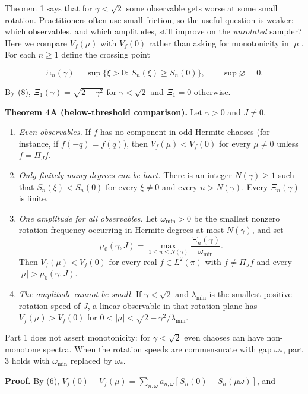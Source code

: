 \documentclass[
  british,
  11pt,
  a4paper,
]{article}
\providecommand{\tightlist}{%
  \setlength{\itemsep}{0pt}\setlength{\parskip}{0pt}}
\begin{document}
Theorem 1 says that for \(\gamma<\sqrt2\) some observable gets worse at
some small rotation. Practitioners often use small friction, so the
useful question is weaker: which observables, and which amplitudes,
still improve on the \emph{unrotated} sampler? Here we compare
\(V_f(\mu)\) with \(V_f(0)\) rather than asking for monotonicity in
\(|\mu|\). For each \(n\ge1\) define the crossing point

\[
\Xi_n(\gamma)=\sup\{\xi>0:\ S_n(\xi)\ge S_n(0)\},\qquad\sup\varnothing=0 .
\]

By (8), \(\Xi_1(\gamma)=\sqrt{2-\gamma^2}\) for \(\gamma<\sqrt2\) and
\(\Xi_1=0\) otherwise.

\textbf{Theorem 4A (below-threshold comparison).} Let \(\gamma>0\) and
\(J\ne0\).

\begin{enumerate}
\def\labelenumi{\arabic{enumi}.}
\tightlist
\item
  \emph{Even observables.} If \(f\) has no component in odd Hermite
  chaoses (for instance, if \(f(-q)=f(q)\)), then \(V_f(\mu)<V_f(0)\)
  for every \(\mu\ne0\) unless \(f=\Pi_Jf\).
\item
  \emph{Only finitely many degrees can be hurt.} There is an integer
  \(N(\gamma)\ge1\) such that \(S_n(\xi)<S_n(0)\) for every \(\xi\ne0\)
  and every \(n>N(\gamma)\). Every \(\Xi_n(\gamma)\) is finite.
\item
  \emph{One amplitude for all observables.} Let \(\omega_{\min}>0\) be
  the smallest nonzero rotation frequency occurring in Hermite degrees
  at most \(N(\gamma)\), and set \[
  \mu_0(\gamma,J)=\max_{1\le n\le N(\gamma)}\frac{\Xi_n(\gamma)}{\omega_{\min}} .
  \] Then \(V_f(\mu)<V_f(0)\) for every real \(f\in L^2(\pi)\) with
  \(f\ne\Pi_Jf\) and every \(|\mu|>\mu_0(\gamma,J)\).
\item
  \emph{The amplitude cannot be small.} If \(\gamma<\sqrt2\) and
  \(\lambda_{\min}\) is the smallest positive rotation speed of \(J\), a
  linear observable in that rotation plane has \(V_f(\mu)>V_f(0)\) for
  \(0<|\mu|<\sqrt{2-\gamma^2}/\lambda_{\min}\).
\end{enumerate}

Part 1 does not assert monotonicity: for \(\gamma<\sqrt2\) even chaoses
can have non-monotone spectra. When the rotation speeds are commensurate
with gap \(\omega_*\), part 3 holds with \(\omega_{\min}\) replaced by
\(\omega_*\).

\textbf{Proof.} By (6),
\(V_f(0)-V_f(\mu)=\sum_{n,\omega}a_{n,\omega}[S_n(0)-S_n(\mu\omega)]\),
and
\end{document}
